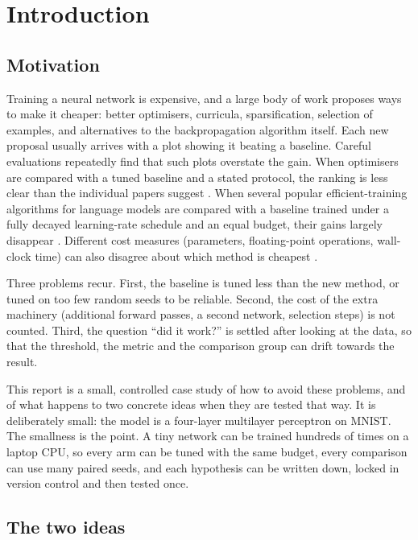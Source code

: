 \chapter{Introduction}\label{ch:intro}

\section{Motivation}
Training a neural network is expensive, and a large body of work proposes ways to make it cheaper: better optimisers, curricula, sparsification, selection of examples, and alternatives to the backpropagation algorithm itself. Each new proposal usually arrives with a plot showing it beating a baseline. Careful evaluations repeatedly find that such plots overstate the gain. When optimisers are compared with a tuned baseline and a stated protocol, the ranking is less clear than the individual papers suggest \citep{schmidt2021crowded}. When several popular efficient-training algorithms for language models are compared with a baseline trained under a fully decayed learning-rate schedule and an equal budget, their gains largely disappear \citep{kaddour2023notrain}. Different cost measures (parameters, floating-point operations, wall-clock time) can also disagree about which method is cheapest \citep{dehghani2022efficiency}.

Three problems recur. First, the baseline is tuned less than the new method, or tuned on too few random seeds to be reliable. Second, the cost of the extra machinery (additional forward passes, a second network, selection steps) is not counted. Third, the question ``did it work?'' is settled after looking at the data, so that the threshold, the metric and the comparison group can drift towards the result.

This report is a small, controlled case study of how to avoid these problems, and of what happens to two concrete ideas when they are tested that way. It is deliberately small: the model is a four-layer multilayer perceptron on MNIST. The smallness is the point. A tiny network can be trained hundreds of times on a laptop CPU, so every arm can be tuned with the same budget, every comparison can use many paired seeds, and each hypothesis can be written down, locked in version control and then tested once.

\section{The two ideas}
